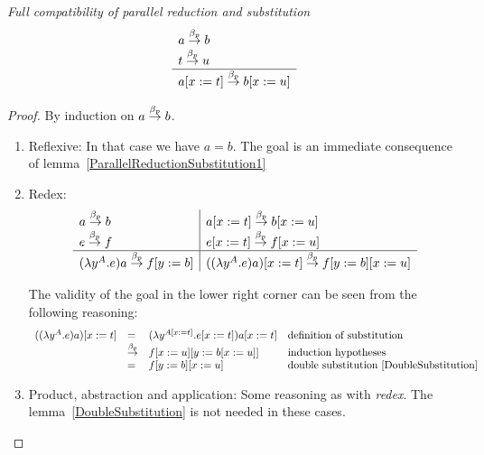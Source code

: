 \begin{lemma}
    \label{ParallelReductionSubstitution2}
    \emph{Full compatibility of parallel reduction and substitution}
    $$
    \begin{array}{l} 
        a \stackrel{\beta_p}{\to} b
        \\
        t \stackrel{\beta_p}{\to} u
     \\ \hline 
        a[x:=t] \stackrel{\beta_p}{\to} b[x:=u]
    \end{array}
    $$

    \begin{proof}
        By induction on $a \stackrel{\beta_p}{\to} b$.

        \begin{enumerate}
        \item Reflexive: In that case we have $a = b$. The goal is an immediate
        consequence of lemma~\ref{ParallelReductionSubstitution1}

        \item Redex:
        $$
        \begin{array}{l|l}
            a \stackrel{\beta_p}{\to} b
            & a[x:=t] \stackrel{\beta_p}{\to} b[x:=u]
            \\
            e \stackrel{\beta_p}{\to} f
            & e[x:=t] \stackrel{\beta_p}{\to} f[x:=u]
            \\
            \hline
            (\lambda y^A. e) a \stackrel{\beta_p}{\to} f[y:=b]
            &
            ((\lambda y^A. e) a)[x:=t] \stackrel{\beta_p}{\to} f[y:=b][x:=u]
        \end{array}
        $$

        The validity of the goal in the lower right corner can be seen from the
        following reasoning:
        $$
        \begin{array}{lllll}
            ((\lambda y^A. e) a)[x:=t]
            &=& (\lambda y^{A[x:=t]}. e[x:=t]) a[x:=t]
            &\text{definition of substitution}
            \\
            &\stackrel{\beta_p}{\to}& f[x:=u][y:=b[x:=u]]
            &\text{induction hypotheses}
            \\
            &=& f[y:=b][x:=u]
            &\text{double substitution~\ref{DoubleSubstitution}}
        \end{array}
        $$

        \item Product, abstraction and application: Some reasoning as with
        \emph{redex}. The lemma~\ref{DoubleSubstitution} is not needed in these
        cases.
        \end{enumerate}
    \end{proof}
\end{lemma}



